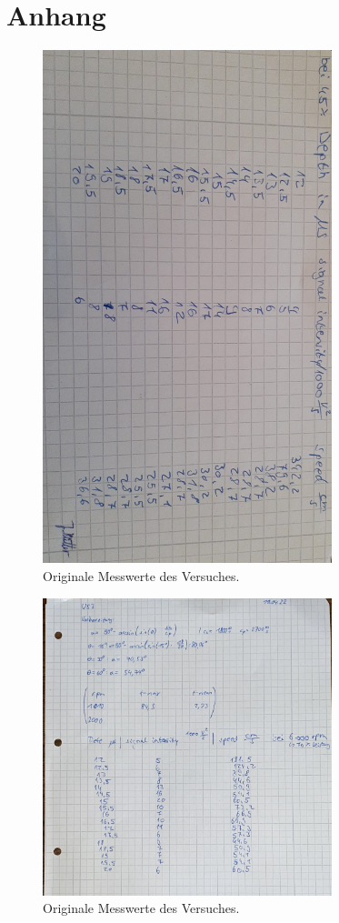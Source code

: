 \section*{Anhang}
\label{sec:Anhang}
\begin{figure}
    \centering
    \includegraphics[angle=90, width=0.75\textwidth]{data/origDaten2.png}
    \caption{Originale Messwerte des Versuches.}
    \label{fig:origDaten2}
\end{figure}
\begin{figure}
    \centering
    \includegraphics[width=0.75\textwidth]{data/origDaten1.png}
    \caption{Originale Messwerte des Versuches.}
    \label{fig:origDaten1}
\end{figure}
